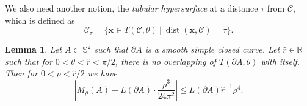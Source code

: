 \documentclass[a4paper,11pt]{amsart}
\newtheorem{lemma}{Lemma}
\begin{document}
We also need another notion, the \textit{tubular hypersurface} at a distance $\tau$ from $\mathcal{C}$, which is defined as
\begin{equation*}
    \mathcal{C}_\tau=\{\mathbf{x}\in T(\mathcal{C},\theta)\ |\ \operatorname{dist}(\mathbf{x},\mathcal{C})=\tau\}.
\end{equation*}
\begin{lemma}\label{integral M}
    Let $A\subset\mathbb{S}^2$ such that $\partial A$ is a smooth simple closed curve. Let $\hat{r}\in\mathbb{R}$ such that for $0<\theta<\hat{r}<\pi/2$, there is no overlapping of $T(\partial A,\theta)$ with itself. Then for $0<\rho<\hat{r}/2$ we have
    \begin{equation*}
       \left| M_\rho(A)-L(\partial A)\cdot\frac{\rho^3}{24\pi^2}\right|\leq {L(\partial A)}{ \hat r^{-1}}\rho^4.
    \end{equation*}
\end{lemma}
\end{document}
